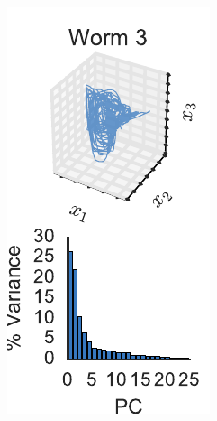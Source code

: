 \documentclass{article}
\begin{document}
\begin{figure}[t]
  \begin{subfigure}[b]{.19\linewidth}
    \includegraphics[width=\textwidth]{pca_trajectory_worm2.pdf}
  \end{subfigure}
  \begin{subfigure}[b]{.19\linewidth}

\end{subfigure}
\end{figure}
\end{document}
